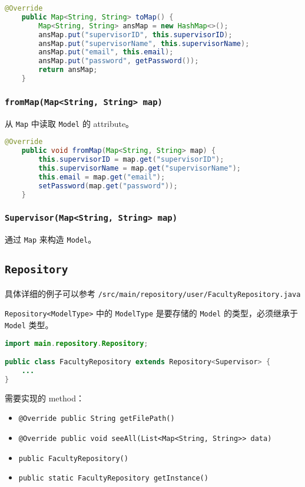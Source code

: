 \documentclass[hyperref,UTF8,12pt,a4paper]{ctexart}
\begin{document}
\begin{lstlisting}[language=Java]
    @Override
    public Map<String, String> toMap() {
        Map<String, String> ansMap = new HashMap<>();
        ansMap.put("supervisorID", this.supervisorID);
        ansMap.put("supervisorName", this.supervisorName);
        ansMap.put("email", this.email);
        ansMap.put("password", getPassword());
        return ansMap;
    }
\end{lstlisting}


\subsubsection{\texttt{fromMap(Map<String, String> map)}}

从 \texttt{Map} 中读取 \texttt{Model} 的 attribute。

\begin{lstlisting}[language=Java]
    @Override
    public void fromMap(Map<String, String> map) {
        this.supervisorID = map.get("supervisorID");
        this.supervisorName = map.get("supervisorName");
        this.email = map.get("email");
		setPassword(map.get("password"));
    }
\end{lstlisting}

\subsubsection{\texttt{Supervisor(Map<String, String> map)}}

通过 \texttt{Map} 来构造 \texttt{Model}。

\subsection{\texttt{Repository}}

具体详细的例子可以参考 \texttt{/src/main/repository/user/FacultyRepository.java}

\texttt{Repository<ModelType>} 中的 \texttt{ModelType} 是要存储的 \texttt{Model} 的类型，必须继承于 \texttt{Model} 类型。

\begin{lstlisting}[language=Java]
import main.repository.Repository;

public class FacultyRepository extends Repository<Supervisor> {
	...
}
\end{lstlisting}

需要实现的 method：

\begin{itemize}
	\item \texttt{@Override public String getFilePath()}
	\item \texttt{@Override public void seeAll(List<Map<String, String>> data)}
	\item \texttt{public FacultyRepository()}
	\item \texttt{public static FacultyRepository getInstance()}
\end{itemize}
\end{document}
